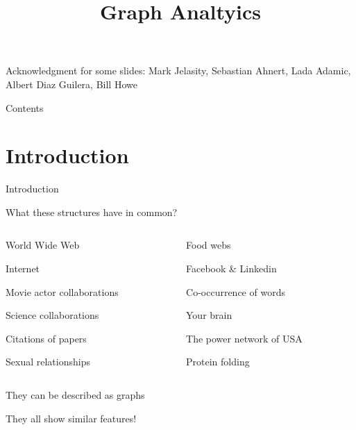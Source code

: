 \title[Graph Analytics]{\textbf{Graph Analtyics}}



\newcommand{\Path}{\ell}
\newcommand{\Diam}{\mathit{diam}}

\begin{frame}
\titlepage

{\footnotesize
Acknowledgment for some slides: Mark Jelasity, Sebastian Ahnert, Lada Adamic, Albert Diaz Guilera, Bill Howe
}


\end{frame}

\begin{frame}[shrink]{Contents}
\tableofcontents
\end{frame}


\section{Introduction}

\begin{frame}{Introduction}

\begin{block}{What these structures have in common?}

\begin{columns}
\begin{column}{0.5\textwidth}
\BI
\item World Wide Web
\item Internet
\item Movie actor collaborations
\item Science collaborations
\item Citations of papers
\item Sexual relationships
\EI
\end{column}
\begin{column}{0.5\textwidth}
\BI
\item Food webs
\item Facebook \& Linkedin
\item Co-occurrence of words
\item Your brain
\item The power network of USA
\item Protein folding
\EI
\end{column}
\end{columns}
\end{block}

\pause
\bigskip
\BI
\item They can be described as graphs
\pause
\item They all show similar features!
\EI

\end{frame}


